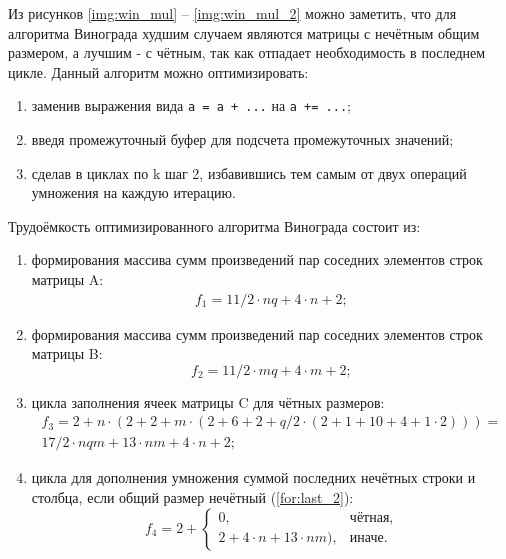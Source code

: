 Из рисунков \ref{img:win_mul} -- \ref{img:win_mul_2} можно заметить, что для алгоритма Винограда худшим случаем являются матрицы с нечётным общим размером, а лучшим - с чётным, так как отпадает необходимость в последнем цикле.
Данный алгоритм можно оптимизировать:
\begin{enumerate}
	\item заменив выражения вида \texttt{a = a + ...} на \texttt{a += ...};
	\item введя промежуточный буфер для подсчета промежуточных значений;
	\item сделав в циклах по k шаг 2, избавившись тем самым от двух операций умножения на каждую итерацию.
\end{enumerate}

Трудоёмкость оптимизированного алгоритма Винограда состоит из:
\begin{enumerate}
	\item  формирования массива сумм произведений пар соседних элементов строк матрицы A:
	\begin{equation}
	\begin{array}{c}
	f_1 = 11/2 \cdot nq + 4 \cdot n + 2 ;
	\end{array}
	\end{equation}
	
	\item  формирования массива сумм произведений пар соседних элементов строк матрицы B:
	\begin{equation}
	f_2 = 11/2 \cdot mq + 4 \cdot m + 2;
	\end{equation}
	
	\item цикла заполнения ячеек матрицы C для чётных размеров:
	\begin{equation}
	\begin{array}{c}
	f_3 = 2 + n \cdot (2 + 2 + m \cdot (2 + 6 + 2 + q/2 \cdot (2 + 1 + 10 + 4 + 1 \cdot 2))) = \\
		17/2 \cdot nqm + 13 \cdot nm + 4 \cdot n + 2 ;
	\end{array}
	\end{equation}
	
	\item цикла для дополнения умножения суммой последних нечётных строки и столбца, если общий размер нечётный (\ref{for:last_2}):
	\begin{equation}
	\label{for:last_2}
	f_4 =  2 + \begin{cases}
	0, & \text{чётная,}\\
	2 +4 \cdot n + 13 \cdot nm), & \text{иначе.}
	\end{cases}
	\end{equation}
\end{enumerate}

